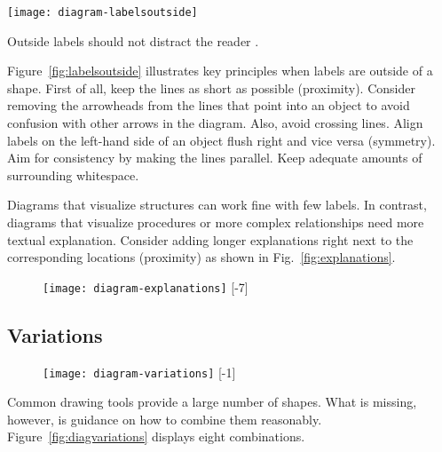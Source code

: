 \begin{marginfigure}
\centering
\texttt{[image: diagram-labelsoutside]}
\caption{\label{fig:labelsoutside} Outside labels should not distract the reader \cite{Carter12}.}%
\end{marginfigure}

Figure~\ref{fig:labelsoutside} illustrates key principles when labels are outside of a shape. First of all, keep the lines as short as possible (proximity). Consider removing the arrowheads from the lines that point into an object to avoid confusion with other arrows in the diagram. Also, avoid crossing lines. Align labels on the left-hand side of an object flush right and vice versa (symmetry). Aim for consistency by making the lines parallel. Keep adequate amounts of surrounding whitespace.

Diagrams that visualize structures can work fine with few labels. In contrast, diagrams that visualize procedures or more complex relationships need more textual explanation. Consider adding longer explanations right next to the corresponding locations (proximity) as shown in Fig.~\ref{fig:explanations}.

\begin{figure}[t]
\centering
\texttt{[image: diagram-explanations]} 
[-7\baselineskip]
\end{figure}


\subsection{Variations}

\begin{figure*}[t]
\centering
\texttt{[image: diagram-variations]}
[-1\baselineskip]
\end{figure*}

Common drawing tools provide a large number of shapes. What is missing, however, is guidance on how to combine them reasonably. Figure~\ref{fig:diagvariations} displays eight combinations.

